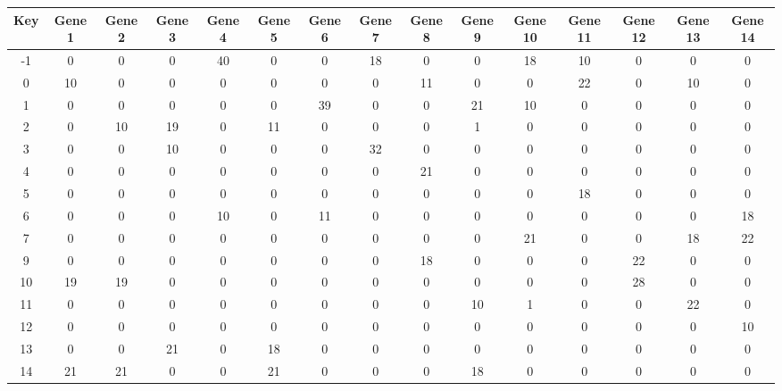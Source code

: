 \begin{tabular}{|c|c|c|c|c|c|c|c|c|c|c|c|c|c|c|}
\hline
Key & Gene 1 & Gene 2 & Gene 3 & Gene 4 & Gene 5 & Gene 6 & Gene 7 & Gene 8 & Gene 9 & Gene 10 & Gene 11 & Gene 12 & Gene 13 & Gene 14 \\
\hline
-1 & 0 & 0 & 0 & 40 & 0 & 0 & 18 & 0 & 0 & 18 & 10 & 0 & 0 & 0 \\
0 & 10 & 0 & 0 & 0 & 0 & 0 & 0 & 11 & 0 & 0 & 22 & 0 & 10 & 0 \\
1 & 0 & 0 & 0 & 0 & 0 & 39 & 0 & 0 & 21 & 10 & 0 & 0 & 0 & 0 \\
2 & 0 & 10 & 19 & 0 & 11 & 0 & 0 & 0 & 1 & 0 & 0 & 0 & 0 & 0 \\
3 & 0 & 0 & 10 & 0 & 0 & 0 & 32 & 0 & 0 & 0 & 0 & 0 & 0 & 0 \\
4 & 0 & 0 & 0 & 0 & 0 & 0 & 0 & 21 & 0 & 0 & 0 & 0 & 0 & 0 \\
5 & 0 & 0 & 0 & 0 & 0 & 0 & 0 & 0 & 0 & 0 & 18 & 0 & 0 & 0 \\
6 & 0 & 0 & 0 & 10 & 0 & 11 & 0 & 0 & 0 & 0 & 0 & 0 & 0 & 18 \\
7 & 0 & 0 & 0 & 0 & 0 & 0 & 0 & 0 & 0 & 21 & 0 & 0 & 18 & 22 \\
9 & 0 & 0 & 0 & 0 & 0 & 0 & 0 & 18 & 0 & 0 & 0 & 22 & 0 & 0 \\
10 & 19 & 19 & 0 & 0 & 0 & 0 & 0 & 0 & 0 & 0 & 0 & 28 & 0 & 0 \\
11 & 0 & 0 & 0 & 0 & 0 & 0 & 0 & 0 & 10 & 1 & 0 & 0 & 22 & 0 \\
12 & 0 & 0 & 0 & 0 & 0 & 0 & 0 & 0 & 0 & 0 & 0 & 0 & 0 & 10 \\
13 & 0 & 0 & 21 & 0 & 18 & 0 & 0 & 0 & 0 & 0 & 0 & 0 & 0 & 0 \\
14 & 21 & 21 & 0 & 0 & 21 & 0 & 0 & 0 & 18 & 0 & 0 & 0 & 0 & 0 \\
\hline
\end{tabular}